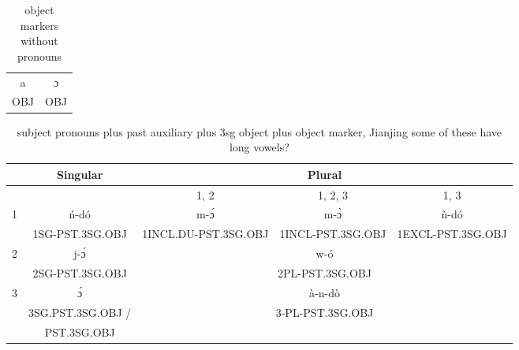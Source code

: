 \documentclass[12pt]{assets/fieldnotes}
\begin{document}
\begin{table}[htb!]
\centering
    \begin{tabular}{cc}
    \toprule
    a & ɔ \\
    OBJ & OBJ\\
     \bottomrule
    \end{tabular}
    \caption{object markers without pronouns}
\end{table} 

\begin{table}[htb!]
    \centering
    \begin{tabular}{ccccc}
        \toprule
        & Singular & \multicolumn{3}{c}{Plural} \\
        \toprule 
        & & 1, 2 & 1, 2, 3 & 1, 3 \\  
        \cmidrule(r){3-3}
        \cmidrule(r){4-4} 
        \cmidrule(r){5-5}
        1 & ń-dó & m-ɔ́ & m-ɔ̀ & \`{n}-dó \\
        & 1SG-PST.3SG.OBJ & 1INCL.DU-PST.3SG.OBJ & 1INCL-PST.3SG.OBJ & 1EXCL-PST.3SG.OBJ\\
        \midrule
        2 & j-ɔ́ & \multicolumn{3}{c}{w-ó} \\
         & 2SG-PST.3SG.OBJ & \multicolumn{3}{c}{2PL-PST.3SG.OBJ} \\
        \midrule
        3 & ɔ́ & \multicolumn{3}{c}{à-n-dò}\\
        & 3SG.PST.3SG.OBJ /  & \multicolumn{3}{c}{3-PL-PST.3SG.OBJ} \\
        & PST.3SG.OBJ \\
        \bottomrule
    \end{tabular}
    \caption{subject pronouns plus past auxiliary plus 3sg object plus object marker, Jianjing some of these have long vowels?}
    \label{tab:fut}
\end{table} 
\end{document}
